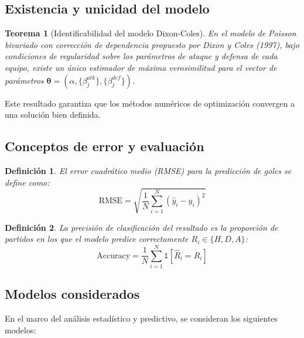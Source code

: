 \documentclass[a4paper,12pt]{article}
\newtheorem{theorem}{Teorema}
\newtheorem{definition}{Definición}
\begin{document}
\subsection{Existencia y unicidad del modelo}

\begin{theorem}[Identificabilidad del modelo Dixon-Coles]
En el modelo de Poisson bivariado con corrección de dependencia propuesto por Dixon y Coles (1997), bajo condiciones de regularidad sobre los parámetros de ataque y defensa de cada equipo, existe un único estimador de máxima verosimilitud para el vector de parámetros $\boldsymbol{\theta} = (\alpha, \{\beta_j^{atk}\}, \{\beta_j^{def}\})$.
\end{theorem}

Este resultado garantiza que los métodos numéricos de optimización convergen a una solución bien definida.

\subsection{Conceptos de error y evaluación}

\begin{definition}
El error cuadrático medio (RMSE) para la predicción de goles se define como:
\begin{equation}
\text{RMSE} = \sqrt{\frac{1}{N}\sum_{i=1}^{N}(\hat{y}_i - y_i)^2}
\end{equation}
\end{definition}

\begin{definition}
La precisión de clasificación del resultado es la proporción de partidos en los que el modelo predice correctamente $R_i \in \{H, D, A\}$:
\begin{equation}
\text{Accuracy} = \frac{1}{N}\sum_{i=1}^{N} \mathbb{1}[\hat{R}_i = R_i]
\end{equation}
\end{definition}

\subsection{Modelos considerados}

En el marco del análisis estadístico y predictivo, se consideran los siguientes modelos:
\end{document}
